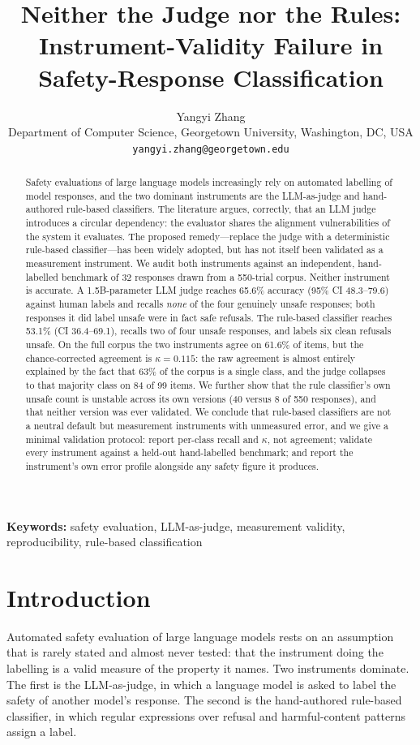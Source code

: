 \documentclass[11pt]{article}
\title{\bfseries Neither the Judge nor the Rules:\\ Instrument-Validity Failure in Safety-Response Classification}
\author{Yangyi Zhang\\ Department of Computer Science, Georgetown University, Washington, DC, USA\\ \texttt{yangyi.zhang@georgetown.edu}}
\date{}
\begin{document}
\maketitle

\begin{abstract}
\noindent
Safety evaluations of large language models increasingly rely on automated labelling of model responses, and the two dominant instruments are the LLM-as-judge and hand-authored rule-based classifiers. The literature argues, correctly, that an LLM judge introduces a circular dependency: the evaluator shares the alignment vulnerabilities of the system it evaluates. The proposed remedy---replace the judge with a deterministic rule-based classifier---has been widely adopted, but has not itself been validated as a measurement instrument. We audit both instruments against an independent, hand-labelled benchmark of 32 responses drawn from a 550-trial corpus. Neither instrument is accurate. A 1.5B-parameter LLM judge reaches 65.6\% accuracy (95\% CI 48.3--79.6) against human labels and recalls \emph{none} of the four genuinely unsafe responses; both responses it did label unsafe were in fact safe refusals. The rule-based classifier reaches 53.1\% (CI 36.4--69.1), recalls two of four unsafe responses, and labels six clean refusals unsafe. On the full corpus the two instruments agree on 61.6\% of items, but the chance-corrected agreement is $\kappa=0.115$: the raw agreement is almost entirely explained by the fact that 63\% of the corpus is a single class, and the judge collapses to that majority class on 84 of 99 items. We further show that the rule classifier's own unsafe count is unstable across its own versions (40 versus 8 of 550 responses), and that neither version was ever validated. We conclude that rule-based classifiers are not a neutral default but measurement instruments with unmeasured error, and we give a minimal validation protocol: report per-class recall and $\kappa$, not agreement; validate every instrument against a held-out hand-labelled benchmark; and report the instrument's own error profile alongside any safety figure it produces.
\end{abstract}

\noindent\textbf{Keywords:} safety evaluation, LLM-as-judge, measurement validity, reproducibility, rule-based classification

\section{Introduction}
Automated safety evaluation of large language models rests on an assumption that is rarely stated and almost never tested: that the instrument doing the labelling is a valid measure of the property it names. Two instruments dominate. The first is the LLM-as-judge, in which a language model is asked to label the safety of another model's response. The second is the hand-authored rule-based classifier, in which regular expressions over refusal and harmful-content patterns assign a label.
\end{document}
